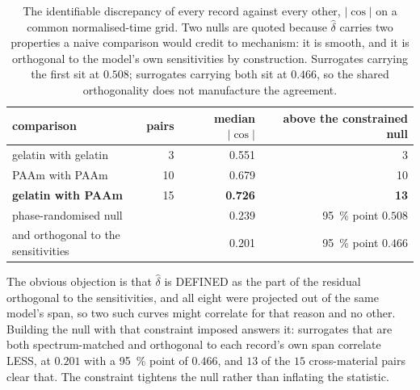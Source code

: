 \documentclass[10pt]{article}
\begin{document}
\begin{table}[htbp]
\centering
\caption{The identifiable discrepancy of every record against every other, $\lvert\cos\rvert$ on
a common normalised-time grid. Two nulls are quoted because $\hat\delta$ carries two properties
a naive comparison would credit to mechanism: it is smooth, and it is orthogonal to the model's
own sensitivities by construction. Surrogates carrying the first sit at $0.508$; surrogates
carrying both sit at $0.466$, so the shared orthogonality does not manufacture the agreement.}
\label{tab:universal}
\begin{tabular}{lrrr}
\toprule
comparison & pairs & median $\lvert\cos\rvert$ & above the constrained null \\
\midrule
gelatin with gelatin & 3 & 0.551 & 3 \\
PAAm with PAAm & 10 & 0.679 & 10 \\
\textbf{gelatin with PAAm} & 15 & \textbf{0.726} & \textbf{13} \\
\midrule
\multicolumn{2}{l}{phase-randomised null} & 0.239 & \SI{95}{\percent} point $0.508$ \\
\multicolumn{2}{l}{\quad and orthogonal to the sensitivities} & 0.201 & \SI{95}{\percent} point $0.466$ \\
\bottomrule
\end{tabular}
\end{table}

The obvious objection is that $\hat\delta$ is DEFINED as the part of the residual orthogonal to
the sensitivities, and all eight were projected out of the same model's span, so two such curves
might correlate for that reason and no other. Building the null with that constraint imposed
answers it: surrogates that are both spectrum-matched and orthogonal to each record's own span
correlate LESS, at $0.201$ with a \SI{95}{\percent} point of $0.466$, and $13$ of the $15$
cross-material pairs clear that. The constraint tightens the null rather than inflating the
statistic.
\end{document}
